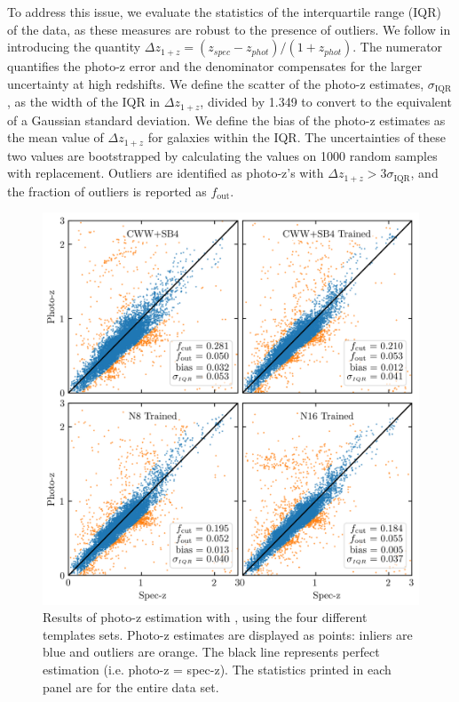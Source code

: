 To address this issue, we evaluate the statistics of the interquartile range (IQR) of the data, as these measures are robust to the presence of outliers.
We follow \citet{Graham2018a} in introducing the quantity $\Delta z_{1+z} = (z_{spec} - z_{phot})/(1 + z_{phot})$.
The numerator quantifies the photo-z error and the denominator compensates for the larger uncertainty at high redshifts. 
We define the scatter of the photo-z estimates, $\sigma_\text{IQR}$,  as the width of the IQR in $\Delta z_{1+z}$, divided by 1.349 to convert to the equivalent of a Gaussian standard deviation. 
We define the bias of the photo-z estimates as the mean value of $\Delta z_{1+z}$ for galaxies within the IQR.
The uncertainties of these two values are bootstrapped by calculating the values on 1000 random samples with replacement. 
Outliers are identified as photo-z's with $\Delta z_{1+z} > 3 \sigma_{\text{IQR}}$, and the fraction of outliers is reported as $f_\text{out}$.

\begin{figure}
    \centering
    \includegraphics{photoz_results.png}
    \caption{Results of photo-z estimation with \bpz, using the four different templates sets. Photo-z estimates are displayed as points: inliers are blue and outliers are orange. The black line represents perfect estimation (i.e. photo-z = spec-z). The statistics printed in each panel are for the entire data set.}
    \label{fig:photoz_results}
\end{figure}

